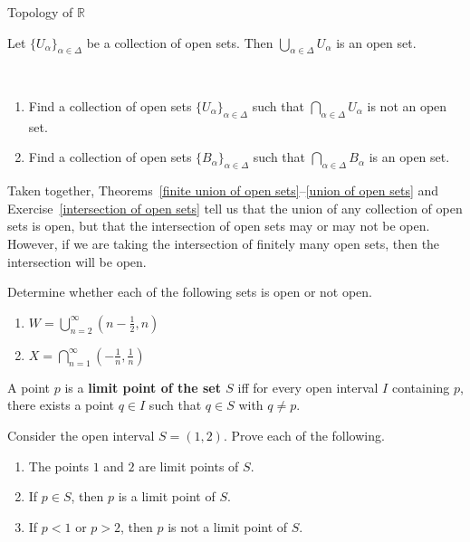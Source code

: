 \begin{section}{Topology of $\mathbb{R}$}
\begin{theorem}\label{union of open sets}
Let $\{U_{\alpha}\}_{\alpha\in\Delta}$ be a collection of open sets.  Then $\bigcup_{\alpha\in\Delta} U_{\alpha}$ is an open set.
\end{theorem}

\begin{exercise}\label{intersection of open sets}\
\begin{enumerate}[label=\textrm{(\alph*)}]
\item Find a collection of open sets $\{U_{\alpha}\}_{\alpha\in\Delta}$ such that $\bigcap_{\alpha\in\Delta} U_{\alpha}$ is not an open set.
\item Find a collection of open sets $\{B_{\alpha}\}_{\alpha\in\Delta}$ such that $\bigcap_{\alpha\in\Delta} B_{\alpha}$ is an open set.
\end{enumerate}
\end{exercise}

\begin{remark}\label{rem:union vs intersection of open sets}
Taken together, Theorems~\ref{finite union of open sets}--\ref{union of open sets} and Exercise~\ref{intersection of open sets} tell us that the union of any collection of open sets is open, but that the intersection of open sets may or may not be open.  However, if we are taking the intersection of finitely many open sets, then the intersection will be open.
\end{remark}

\begin{exercise}
Determine whether each of the following sets is open or not open.
\begin{multicols}{2}
\begin{enumerate}[label=\textrm{(\alph*)}]
\item $\displaystyle W=\bigcup_{n=2}^{\infty} \left(n - \frac{1}{2},n\right)$
\item $\displaystyle X=\bigcap_{n=1}^{\infty} \left(-\frac{1}{n}, \frac{1}{n}\right)$
\end{enumerate}
\end{multicols}
\end{exercise}

\begin{definition}
A point $p$ is a \textbf{limit point of the set $S$} iff for every open interval $I$ containing $p$, there exists a point $q \in I$ such that $q \in S$ with $q\neq p$.
\end{definition}

\begin{problem}
Consider the open interval $S=(1,2)$. Prove each of the following.
\begin{enumerate}[label=\textrm{(\alph*)}]
\item The points $1$ and $2$ are limit points of $S$.
\item If $p\in S$, then $p$ is a limit point of $S$.
\item If $p<1$ or $p>2$, then $p$ is not a limit point of $S$.
\end{enumerate}
\end{problem}


\end{section}
